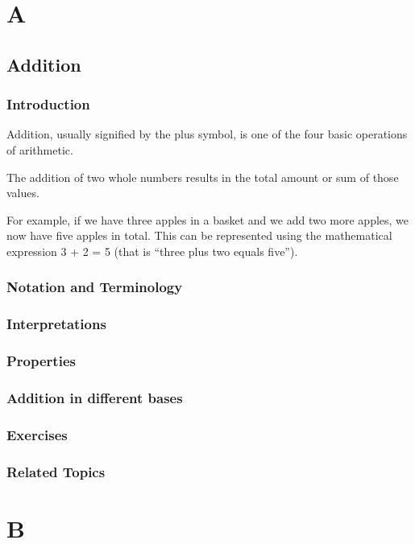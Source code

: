 \documentclass[a4paper]{book}
\begin{document}
\chapter{A}
\section{Addition}

\subsection{Introduction}
Addition, usually signified by the plus symbol, is one of the four basic operations of arithmetic.

The addition of two whole numbers results in the total amount or sum of those values.

For example, if we have three apples in a basket and we add two more apples, we now have five apples in total.
This can be represented using the mathematical expression 3 + 2 = 5 (that is ``three plus two equals five'').

\subsection{Notation and Terminology}

\subsection{Interpretations}

\subsection{Properties}

\subsection{Addition in different bases}

\subsection{Exercises}

\subsection{Related Topics}


\chapter{B}
\end{document}
